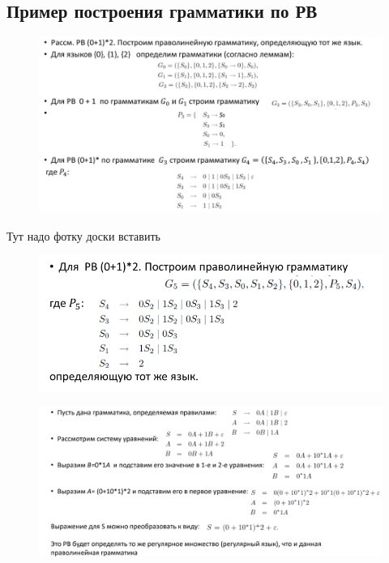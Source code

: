 \documentclass{article}
\begin{document}
\subsection{Пример построения грамматики по РВ}


\begin{figure}[H]
    \centering
    \includegraphics[width=1\linewidth]{Снимок экрана 2025-03-06 085249.png}
\end{figure}


Тут надо фотку доски вставить 

\begin{figure}[H]
    \centering
    \includegraphics[width=1\linewidth]{Снимок экрана 2025-03-06 085516.png}
\end{figure}


\begin{figure}[H]
    \centering
    \includegraphics[width=1\linewidth]{Снимок экрана 2025-03-06 085735.png}
\end{figure}
\end{document}
